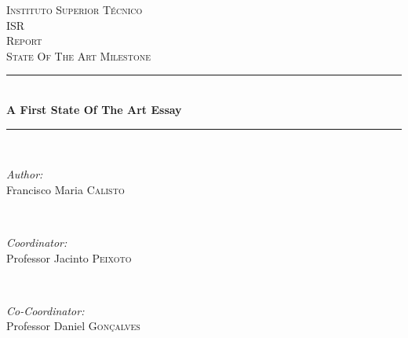 \begin{titlepage}

\newcommand{\HRule}{\rule{\linewidth}{0.5mm}} %

\center %
 

\textsc{\LARGE Instituto Superior T\'{e}cnico}\\[1.5cm]
\textsc{\Large ISR}\\[0.5cm]
\textsc{\large Report}\\[0.25cm]
\textsc{\small State Of The Art Milestone}\\[0.25cm]


\HRule \\[0.5cm]
{ \large \bfseries A First State Of The Art Essay}\\[0.25cm] %
\HRule \\[0.5cm]
 

\begin{minipage}{0.4\textwidth}
\begin{flushleft} \large
\emph{Author:}\\
Francisco Maria \textsc{Calisto} %
\end{flushleft}
\end{minipage}
~
\begin{minipage}{0.4\textwidth}
\begin{flushright} \large
\emph{Coordinator:} \\
Professor Jacinto \textsc{Peixoto} %
\end{flushright}
~
\begin{flushright} \large
\emph{Co-Coordinator:} \\
Professor Daniel \textsc{Gon\c{c}alves} %
\end{flushright}
\end{minipage}\\[2cm]


\end{titlepage}
